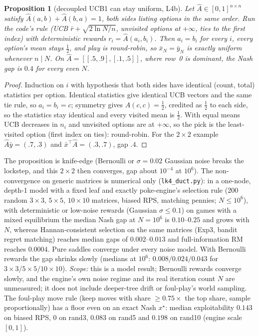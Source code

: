 \documentclass[10pt]{article}
\theoremstyle{plain}
\newtheorem{proposition}[theorem]{Proposition}
\theoremstyle{definition}
\theoremstyle{remark}
\newcommand{\Ahat}{\hat A}
\begin{document}
\begin{proposition}[decoupled UCB1 can stay uniform, L4b]\label{prop:L4b}
Let $\Ahat\in[0,1]^{n\times n}$ satisfy $\Ahat(a,b)+\Ahat(b,a)=1$, both sides listing options in the same order. Run the code's rule (UCB $\bar r+\sqrt{2\ln N/n}$, unvisited options at $+\infty$, ties to the first index) with deterministic rewards $r_i=\Ahat(a_i,b_i)$. Then $a_i=b_i$ for every $i$, every option's mean stays $\frac12$, and play is round-robin, so $\bar x_N=\bar y_N$ is exactly uniform whenever $n\mid N$. On $\Ahat=[[.5,.9],[.1,.5]]$, where row~0 is dominant, the Nash gap is $0.4$ for every even $N$.
\end{proposition}
\begin{proof}
Induction on $i$ with hypothesis that both sides have identical (count, total) statistics per option. Identical statistics give identical UCB vectors and the same tie rule, so $a_i=b_i=c$; symmetry gives $\Ahat(c,c)=\frac12$, credited as $\frac12$ to each side, so the statistics stay identical and every visited mean is $\frac12$. With equal means UCB decreases in $n_i$ and unvisited options are at $+\infty$, so the pick is the least-visited option (first index on ties): round-robin. For the $2\times2$ example $\Ahat\bar y=(.7,.3)$ and $\bar x^\top\Ahat=(.3,.7)$, gap $.4$.
\end{proof}
The proposition is knife-edge (Bernoulli or $\sigma=0.02$ Gaussian noise breaks the lockstep, and this $2\times2$ then converges, gap about $10^{-4}$ at $10^6$). The non-convergence on generic matrices is numerical only (\texttt{lk4\_duct.py}): in a one-node, depth-1 model with a fixed leaf and exactly poke-engine's selection rule (200 random $3{\times}3$, $5{\times}5$, $10{\times}10$ matrices, biased RPS, matching pennies; $N\le10^6$), with deterministic or low-noise rewards (Gaussian $\sigma\le0.1$) on games with a mixed equilibrium the median Nash gap at $N=10^6$ is $0.10$--$0.25$ and grows with $N$, whereas Hannan-consistent selection on the same matrices (Exp3, bandit regret matching) reaches median gaps of $0.002$--$0.013$ and full-information RM reaches $0.0004$. Pure saddles converge under every noise model. With Bernoulli rewards the gap shrinks slowly (medians at $10^6$: $0.008/0.024/0.043$ for $3{\times}3/5{\times}5/10{\times}10$). \emph{Scope:} this is a model result; Bernoulli rewards converge slowly, and the engine's own noise regime and its real iteration count $N$ are unmeasured; it does not include deeper-tree drift or foul-play's world sampling. The foul-play move rule (keep moves with share $\ge0.75\times$ the top share, sample proportionally) has a floor even on an exact Nash $x^\star$: median exploitability $0.143$ on biased RPS, $0$ on rand3, $0.083$ on rand5 and $0.198$ on rand10 (engine scale $[0,1]$).
\end{document}

